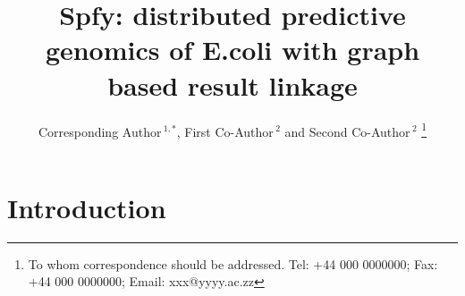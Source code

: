 \documentclass[a4,center,fleqn]{NAR}
\begin{document}
\title{Spfy: distributed predictive genomics of E.coli with graph based result linkage}

\author{%
Corresponding Author\,$^{1,*}$,
First Co-Author\,$^{2}$
and Second Co-Author\,$^2$%
\footnote{To whom correspondence should be addressed.
Tel: +44 000 0000000; Fax: +44 000 0000000; Email: xxx@yyyy.ac.zz}}

\address{%
$^{1}$Affiliation of Corresponding Author
and
$^{2}$Affiliation of Both Co-Authors}


\maketitle

\begin{abstract}

\end{abstract}


\section{Introduction}
\end{document}

